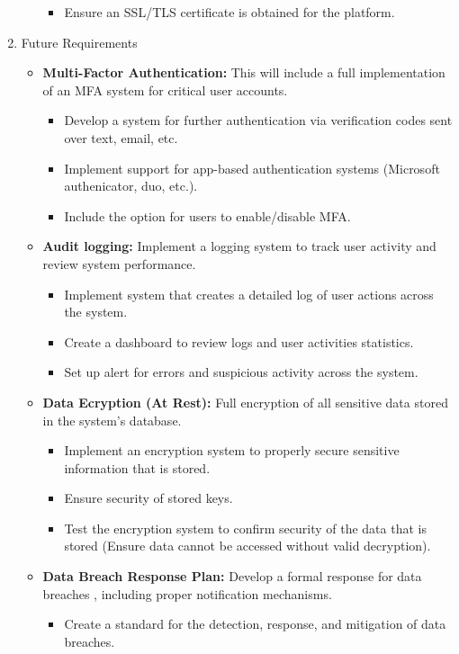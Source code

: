 \documentclass{article}
\begin{document}
\begin{enumerate}
\begin{itemize}
\begin{itemize}
				\item Ensure an SSL/TLS certificate is obtained for the platform.
			\end{itemize}
		\end{itemize}
	\item Future Requirements
		\begin{itemize}
			\item \textbf{Multi-Factor Authentication:} This will include a full implementation of an MFA system for critical user accounts.
			\begin{itemize}
				\item Develop a system for further authentication via verification codes sent over text, email, etc.
				\item Implement support for app-based authentication systems (Microsoft authenicator, duo, etc.).
				\item Include the option for users to enable/disable MFA.
			\end{itemize}
			\item \textbf{Audit logging:} Implement a logging system to track user activity and review system performance.
			\begin{itemize}
				\item Implement system that creates a detailed log of user actions across the system.
				\item Create a dashboard to review logs and user activities statistics.
				\item Set up alert for errors and suspicious activity across the system.
			\end{itemize}
			\item \textbf{Data Ecryption (At Rest):} Full encryption of all sensitive data stored in the system's database.
			\begin{itemize}
				\item Implement an encryption system to properly secure sensitive information that is stored.
				\item Ensure security of stored keys.
				\item Test the encryption system to confirm security of the data that is stored (Ensure data cannot be accessed without valid decryption).
			\end{itemize}
			\item \textbf{Data Breach Response Plan:} Develop a formal response for data breaches , including proper notification mechanisms.
			\begin{itemize}
				\item Create a standard for the detection, response, and mitigation of data breaches.

\end{itemize}
\end{itemize}
\end{enumerate}
\end{document}

